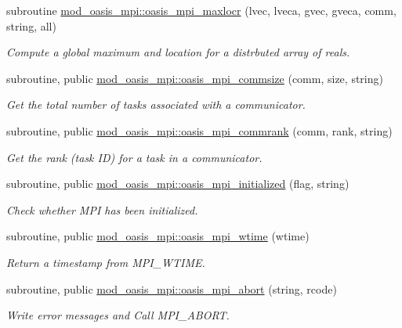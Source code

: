 \begin{DoxyCompactItemize}
subroutine \hyperlink{namespacemod__oasis__mpi_a915aaf2f2d17f9108e8d08c2e4976e49}{mod\+\_\+oasis\+\_\+mpi\+::oasis\+\_\+mpi\+\_\+maxlocr} (lvec, lveca, gvec, gveca, comm, string, all)
\begin{DoxyCompactList}\small\item\em Compute a global maximum and location for a distrbuted array of reals. \end{DoxyCompactList}\item 
subroutine, public \hyperlink{namespacemod__oasis__mpi_adac784196d7af85611752214137dd4db}{mod\+\_\+oasis\+\_\+mpi\+::oasis\+\_\+mpi\+\_\+commsize} (comm, size, string)
\begin{DoxyCompactList}\small\item\em Get the total number of tasks associated with a communicator. \end{DoxyCompactList}\item 
subroutine, public \hyperlink{namespacemod__oasis__mpi_a2690a841a331f4398cc4b5a244bbc52e}{mod\+\_\+oasis\+\_\+mpi\+::oasis\+\_\+mpi\+\_\+commrank} (comm, rank, string)
\begin{DoxyCompactList}\small\item\em Get the rank (task ID) for a task in a communicator. \end{DoxyCompactList}\item 
subroutine, public \hyperlink{namespacemod__oasis__mpi_a384f170e63ac03f25d3bd549245b43f3}{mod\+\_\+oasis\+\_\+mpi\+::oasis\+\_\+mpi\+\_\+initialized} (flag, string)
\begin{DoxyCompactList}\small\item\em Check whether M\+PI has been initialized. \end{DoxyCompactList}\item 
subroutine, public \hyperlink{namespacemod__oasis__mpi_aa3786c2cab131c3834583e7943ba28c8}{mod\+\_\+oasis\+\_\+mpi\+::oasis\+\_\+mpi\+\_\+wtime} (wtime)
\begin{DoxyCompactList}\small\item\em Return a timestamp from M\+P\+I\+\_\+\+W\+T\+I\+ME. \end{DoxyCompactList}\item 
subroutine, public \hyperlink{namespacemod__oasis__mpi_a5b21b6d8732d5f7b70d8b20cefe0072f}{mod\+\_\+oasis\+\_\+mpi\+::oasis\+\_\+mpi\+\_\+abort} (string, rcode)
\begin{DoxyCompactList}\small\item\em Write error messages and Call M\+P\+I\+\_\+\+A\+B\+O\+RT. \end{DoxyCompactList}\item 

\end{DoxyCompactItemize}
